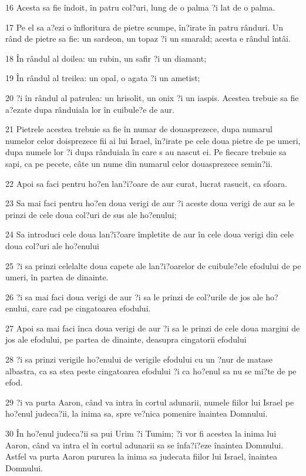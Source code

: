 \par 16 Acesta sa fie îndoit, în patru col?uri, lung de o palma ?i lat de o palma.
\par 17 Pe el sa a?ezi o înfloritura de pietre scumpe, în?irate în patru rânduri. Un rând de pietre sa fie: un sardeon, un topaz ?i un smarald; acesta e rândul întâi.
\par 18 În rândul al doilea: un rubin, un safir ?i un diamant;
\par 19 În rândul al treilea: un opal, o agata ?i un ametist;
\par 20 ?i în rândul al patrulea: un hrisolit, un onix ?i un iaspis. Acestea trebuie sa fie a?ezate dupa rânduiala lor în cuibule?e de aur.
\par 21 Pietrele acestea trebuie sa fie în numar de douasprezece, dupa numarul numelor celor doisprezece fii ai lui Israel, în?irate pe cele doua pietre de pe umeri, dupa numele lor ?i dupa rânduiala în care s au nascut ei. Pe fiecare trebuie sa sapi, ca pe pecete, câte un nume din numarul celor douasprezece semin?ii.
\par 22 Apoi sa faci pentru ho?en lan?i?oare de aur curat, lucrat rasucit, ca sfoara.
\par 23 Sa mai faci pentru ho?en doua verigi de aur ?i aceste doua verigi de aur sa le prinzi de cele doua col?uri de sus ale ho?enului;
\par 24 Sa introduci cele doua lan?i?oare împletite de aur în cele doua verigi din cele doua col?uri ale ho?enului
\par 25 ?i sa prinzi celelalte doua capete ale lan?i?oarelor de cuibule?ele efodului de pe umeri, în partea de dinainte.
\par 26 ?i sa mai faci doua verigi de aur ?i sa le prinzi de col?urile de jos ale ho?enului, care cad pe cingatoarea efodului.
\par 27 Apoi sa mai faci înca doua verigi de aur ?i sa le prinzi de cele doua margini de jos ale efodului, pe partea de dinainte, deasupra cingatorii efodului
\par 28 ?i sa prinzi verigile ho?enului de verigile efodului cu un ?nur de matase albastra, ca sa stea peste cingatoarea efodului ?i ca ho?enul sa nu se mi?te de pe efod.
\par 29 ?i va purta Aaron, când va intra în cortul adunarii, numele fiilor lui Israel pe ho?enul judeca?ii, la inima sa, spre ve?nica pomenire înaintea Domnului.
\par 30 În ho?enul judeca?ii sa pui Urim ?i Tumim; ?i vor fi acestea la inima lui Aaron, când va intra el în cortul adunarii sa se înfa?i?eze înaintea Domnului. Astfel va purta Aaron pururea la inima sa judecata fiilor lui Israel, înaintea Domnului.
